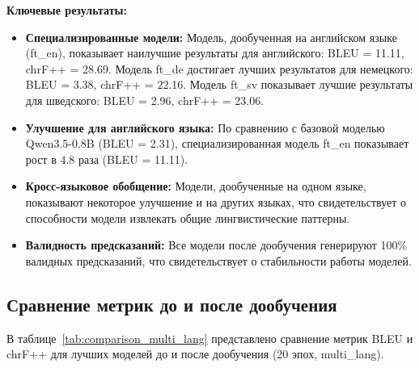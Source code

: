 \documentclass[14pt,a4paper]{extreport}
\begin{document}
\textbf{Ключевые результаты:}
\begin{itemize}
    \item \textbf{Специализированные модели:} Модель, дообученная на английском языке (ft\_en), показывает наилучшие результаты для английского: BLEU = 11.11, chrF++ = 28.69. Модель ft\_de достигает лучших результатов для немецкого: BLEU = 3.38, chrF++ = 22.16. Модель ft\_sv показывает лучшие результаты для шведского: BLEU = 2.96, chrF++ = 23.06.
    
    \item \textbf{Улучшение для английского языка:} По сравнению с базовой моделью Qwen3.5-0.8B (BLEU = 2.31), специализированная модель ft\_en показывает рост в 4.8 раза (BLEU = 11.11).
    
    \item \textbf{Кросс-языковое обобщение:} Модели, дообученные на одном языке, показывают некоторое улучшение и на других языках, что свидетельствует о способности модели извлекать общие лингвистические паттерны.
    
    \item \textbf{Валидность предсказаний:} Все модели после дообучения генерируют 100\% валидных предсказаний, что свидетельствует о стабильности работы моделей.
\end{itemize}

\subsection{Сравнение метрик до и после дообучения}

В таблице~\ref{tab:comparison_multi_lang} представлено сравнение метрик BLEU и chrF++ для лучших моделей до и после дообучения (20 эпох, multi\_lang).
\end{document}
